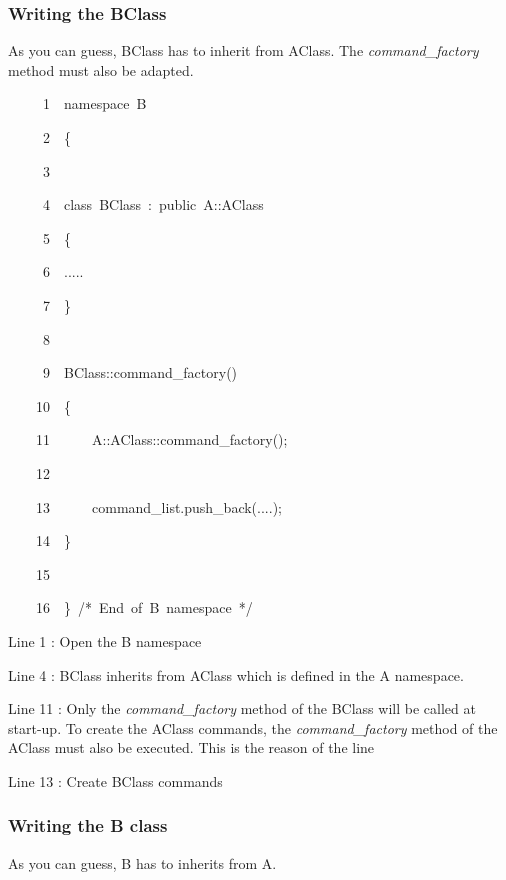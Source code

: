 \subsubsection{Writing the BClass}

As you can guess, BClass has to inherit from AClass. The \emph{command\_factory}
method must also be adapted.


\begin{lyxcode}
~~~~~1~~namespace~B

~~~~~2~~\{

~~~~~3~~

~~~~~4~~class~BClass~:~public~A::AClass

~~~~~5~~\{

~~~~~6~~.....

~~~~~7~~\}

~~~~~8~~

~~~~~9~~BClass::command\_factory()

~~~~10~~\{

~~~~11~~~~~~A::AClass::command\_factory();

~~~~12~~

~~~~13~~~~~~command\_list.push\_back(....);

~~~~14~~\}

~~~~15~~

~~~~16~~\}~/{*}~End~of~B~namespace~{*}/
\end{lyxcode}


Line 1 : Open the B namespace

Line 4 : BClass inherits from AClass which is defined in the A namespace.

Line 11 : Only the \emph{command\_factory} method of the BClass will
be called at start-up. To create the AClass commands, the \emph{command\_factory}
method of the AClass must also be executed. This is the reason of
the line

Line 13 : Create BClass commands


\subsubsection{Writing the B class}

As you can guess, B has to inherits from A.

